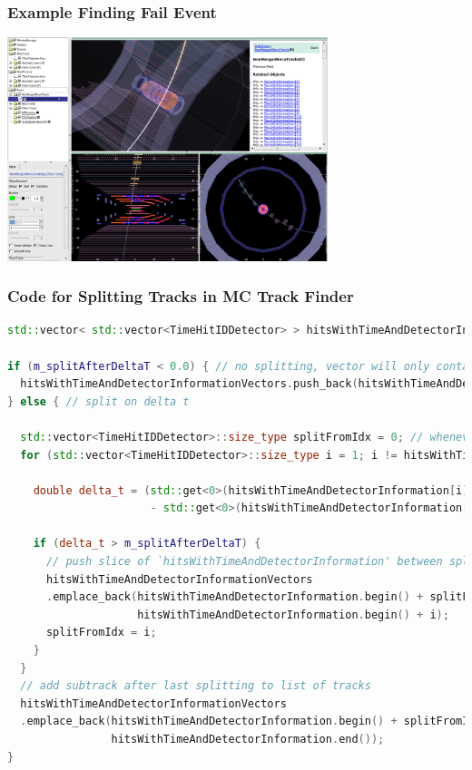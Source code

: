 \documentclass[18pt]{beamer}
\begin{document}
  \begin{frame}
  \begin{center}
    \frametitle{Example Finding Fail Event}
    \includegraphics[width=0.7\textwidth]{figures/b2display_screenshots/b2display_example_1trackevt.png}
  \end{center}
\end{frame}

\begin{frame}[fragile]
  \frametitle{Code for Splitting Tracks in MC Track Finder}
\begin{lstlisting}[language=C++]
std::vector< std::vector<TimeHitIDDetector> > hitsWithTimeAndDetectorInformationVectors;

if (m_splitAfterDeltaT < 0.0) { // no splitting, vector will only contain a single hitInformation vector
  hitsWithTimeAndDetectorInformationVectors.push_back(hitsWithTimeAndDetectorInformation);
} else { // split on delta t

  std::vector<TimeHitIDDetector>::size_type splitFromIdx = 0; // whenever splitting subtrack, start slice from this index
  for (std::vector<TimeHitIDDetector>::size_type i = 1; i != hitsWithTimeAndDetectorInformation.size(); i++) {

    double delta_t = (std::get<0>(hitsWithTimeAndDetectorInformation[i])
                      - std::get<0>(hitsWithTimeAndDetectorInformation[i - 1]));

    if (delta_t > m_splitAfterDeltaT) {
      // push slice of `hitsWithTimeAndDetectorInformation' between splitFromidx  and previous index
      hitsWithTimeAndDetectorInformationVectors
      .emplace_back(hitsWithTimeAndDetectorInformation.begin() + splitFromIdx,
                    hitsWithTimeAndDetectorInformation.begin() + i);
      splitFromIdx = i;
    }
  }
  // add subtrack after last splitting to list of tracks
  hitsWithTimeAndDetectorInformationVectors
  .emplace_back(hitsWithTimeAndDetectorInformation.begin() + splitFromIdx,
                hitsWithTimeAndDetectorInformation.end());
}
\end{lstlisting}
\end{frame}
\backupend
\end{document}
